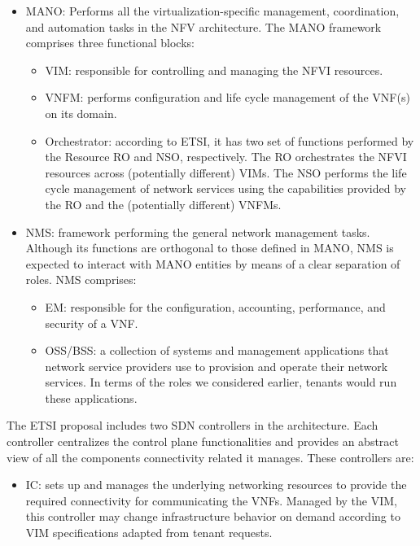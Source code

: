 \documentclass[a4paper,12pt]{report} %
\begin{document}
\begin{itemize}
\item \gls{MANO}: Performs all the virtualization-specific management, coordination, and automation tasks in the NFV architecture. The MANO framework comprises three functional blocks:
\begin{itemize}
\item \gls{VIM}: responsible for controlling and managing the NFVI resources.
\end{itemize}
\begin{itemize}
\item \gls{VNFM}: performs configuration and life cycle management of the VNF(s) on its domain.
\end{itemize}
\begin{itemize}
\item Orchestrator: according to ETSI, it has two set of functions performed by the Resource \gls{RO} and \gls{NSO}, respectively. The RO orchestrates the NFVI resources across (potentially different) VIMs. The NSO performs the life cycle management of network
services using the capabilities provided by the
RO and the (potentially different) VNFMs.
\end{itemize}
\end{itemize}
\begin{itemize}
\item \gls{NMS}: framework performing the general network management tasks. Although its functions are orthogonal to those defined in MANO, NMS is expected to interact with MANO entities by means of a clear separation of roles. NMS comprises:
\begin{itemize}
\item \gls{EM}: responsible for the configuration,
accounting, performance, and security of a VNF.
\end{itemize}
\begin{itemize}
\item \gls{OSS/BSS}: a collection of systems and management applications that network service providers use to provision and operate their network
services. In terms of the roles we considered
earlier, tenants would run these applications.
\end{itemize}
\end{itemize}
The ETSI proposal includes two SDN controllers
in the architecture. Each controller centralizes
the control plane functionalities and provides an
abstract view of all the components connectivity related it manages. These controllers are:
\begin{itemize}
\item \gls{IC}: sets up
and manages the underlying networking resources to provide the required connectivity for communicating the VNFs.
Managed by the VIM, this controller may change
infrastructure behavior on demand according to
VIM specifications adapted from tenant requests.
\end{itemize}
\end{document}
